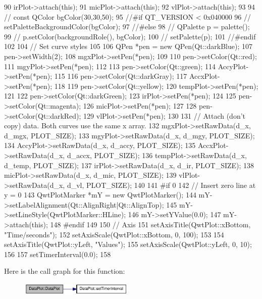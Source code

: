\begin{DoxyCode}
{90     irPlot->attach(this);
91     micPlot->attach(this);
92     vlPlot->attach(this);
93 
94 //    const QColor bgColor(30,30,50);
95 //#if QT_VERSION < 0x040000
96 //    setPaletteBackgroundColor(bgColor);
97 //#else
98 //    QPalette p = palette();
99 //    p.setColor(backgroundRole(), bgColor);
100 //    setPalette(p);
101 //#endif
102 
104     // Set curve styles
105 
106     QPen *pen = new QPen(Qt::darkBlue);
107     pen->setWidth(2);
108     mgxPlot->setPen(*pen);
109 
110     pen->setColor(Qt::red);
111     mgyPlot->setPen(*pen);
112 
113     pen->setColor(Qt::green);
114     AccyPlot->setPen(*pen);
115 
116     pen->setColor(Qt::darkGray);
117     AccxPlot->setPen(*pen);
118 
119     pen->setColor(Qt::yellow);
120     tempPlot->setPen(*pen);
121 
122     pen->setColor(Qt::darkGreen);
123     irPlot->setPen(*pen);
124 
125     pen->setColor(Qt::magenta);
126     micPlot->setPen(*pen);
127 
128     pen->setColor(Qt::darkRed);
129     vlPlot->setPen(*pen);
130 
131     // Attach (don't copy) data. Both curves use the same x array.
132     mgxPlot->setRawData(d_x, d_mgx, PLOT_SIZE);
133     mgyPlot->setRawData(d_x, d_mgy, PLOT_SIZE);
134     AccyPlot->setRawData(d_x, d_accy, PLOT_SIZE);
135     AccxPlot->setRawData(d_x, d_accx, PLOT_SIZE);
136     tempPlot->setRawData(d_x, d_temp, PLOT_SIZE);
137     irPlot->setRawData(d_x, d_ir, PLOT_SIZE);
138     micPlot->setRawData(d_x, d_mic, PLOT_SIZE);
139     vlPlot->setRawData(d_x, d_vl, PLOT_SIZE);
140 
141 #if 0
142     //  Insert zero line at y = 0
143     QwtPlotMarker *mY = new QwtPlotMarker();
144     mY->setLabelAlignment(Qt::AlignRight|Qt::AlignTop);
145     mY->setLineStyle(QwtPlotMarker::HLine);
146     mY->setYValue(0.0);
147     mY->attach(this);
148 #endif
149 
150     // Axis 
151     setAxisTitle(QwtPlot::xBottom, "Time/seconds");
152     setAxisScale(QwtPlot::xBottom, 0, 100);
153 
154     setAxisTitle(QwtPlot::yLeft, "Values");
155     setAxisScale(QwtPlot::yLeft, 0, 10);
156     
157     setTimerInterval(0.0); 
158 }
\end{DoxyCode}




Here is the call graph for this function:\nopagebreak
\begin{figure}[H]
\begin{center}
\leavevmode
\includegraphics[width=154pt]{classDataPlot_a1343acbd6095212532c4315d6e9f1711_cgraph}
\end{center}
\end{figure}




